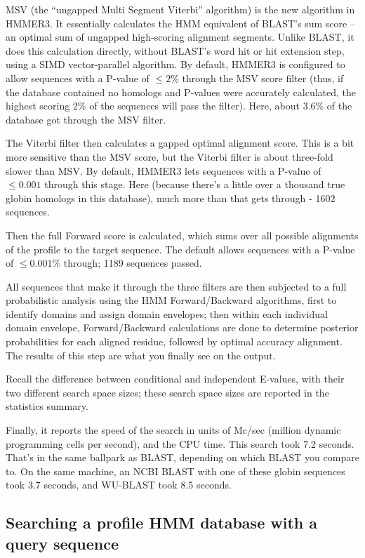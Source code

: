 MSV (the ``ungapped Multi Segment Viterbi'' algorithm) is the new
algorithm in HMMER3. It essentially calculates the HMM equivalent of
BLAST's sum score -- an optimal sum of ungapped high-scoring alignment
segments. Unlike BLAST, it does this calculation directly, without
BLAST's word hit or hit extension step, using a SIMD vector-parallel
algorithm. By default, HMMER3 is configured to allow sequences with a
P-value of $\leq 2$\% through the MSV score filter (thus, if the
database contained no homologs and P-values were accurately
calculated, the highest scoring 2\% of the sequences will pass the
filter). Here, about 3.6\% of the database got through the MSV filter.

The Viterbi filter then calculates a gapped optimal alignment score.
This is a bit more sensitive than the MSV score, but the Viterbi
filter is about three-fold slower than MSV. By default, HMMER3 lets
sequences with a P-value of $\leq 0.001$ through this stage. Here
(because there's a little over a thousand true globin homologs in this
database), much more than that gets through - 1602 sequences.

Then the full Forward score is calculated, which sums over all
possible alignments of the profile to the target sequence. The default
allows sequences with a P-value of $\leq 0.001$\% through; 1189
sequences passed.

All sequences that make it through the three filters are then
subjected to a full probabilistic analysis using the HMM
Forward/Backward algorithms, first to identify domains and assign
domain envelopes; then within each individual domain envelope,
Forward/Backward calculations are done to determine posterior
probabilities for each aligned residue, followed by optimal accuracy
alignment. The results of this step are what you finally see on the
output.

Recall the difference between conditional and independent E-values,
with their two different search space sizes; these search space sizes
are reported in the statistics summary. 

Finally, it reports the speed of the search in units of Mc/sec
(million dynamic programming cells per second), and the CPU time.
This search took 7.2 seconds. That's in the same ballpark as BLAST,
depending on which BLAST you compare to. On the same machine, an NCBI
BLAST with one of these globin sequences took 3.7 seconds, and
WU-BLAST took 8.5 seconds.



\subsection{Searching a profile HMM database with a query sequence}

